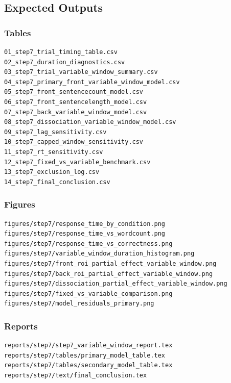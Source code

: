 \subsection{Expected Outputs}

\subsubsection*{Tables}
\begin{verbatim}
01_step7_trial_timing_table.csv
02_step7_duration_diagnostics.csv
03_step7_trial_variable_window_summary.csv
04_step7_primary_front_variable_window_model.csv
05_step7_front_sentencecount_model.csv
06_step7_front_sentencelength_model.csv
07_step7_back_variable_window_model.csv
08_step7_dissociation_variable_window_model.csv
09_step7_lag_sensitivity.csv
10_step7_capped_window_sensitivity.csv
11_step7_rt_sensitivity.csv
12_step7_fixed_vs_variable_benchmark.csv
13_step7_exclusion_log.csv
14_step7_final_conclusion.csv
\end{verbatim}

\subsubsection*{Figures}
\begin{verbatim}
figures/step7/response_time_by_condition.png
figures/step7/response_time_vs_wordcount.png
figures/step7/response_time_vs_correctness.png
figures/step7/variable_window_duration_histogram.png
figures/step7/front_roi_partial_effect_variable_window.png
figures/step7/back_roi_partial_effect_variable_window.png
figures/step7/dissociation_partial_effect_variable_window.png
figures/step7/fixed_vs_variable_comparison.png
figures/step7/model_residuals_primary.png
\end{verbatim}

\subsubsection*{Reports}
\begin{verbatim}
reports/step7/step7_variable_window_report.tex
reports/step7/tables/primary_model_table.tex
reports/step7/tables/secondary_model_table.tex
reports/step7/text/final_conclusion.tex
\end{verbatim}

